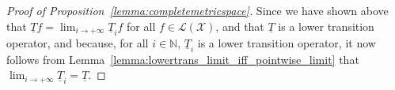 \documentclass[10pt,a4paper]{paper}
\theoremstyle{definition}
\newcommand{\nats}{\mathbb{N}}
\newcommand{\reals}{\mathbb{R}}
\newcommand{\realspos}{\reals_{>0}}
\newcommand{\states}{\mathcal{X}}
\newcommand{\lt}{\underline{T}}
\newcommand{\gambles}{\mathcal{L}}
\newcommand{\gamblesX}{\gambles(\states)}
\newcommand{\norm}[1]{\left\lVert #1 \right\rVert}
\newcommand{\coloneqq}{:\!=}
\begin{document}
\begin{proof}[Proof of Proposition~\ref{lemma:completemetricspace}]
Since we have shown above that $\lt f=\lim_{i\to+\infty}\lt_i f$ for all $f\in\gamblesX$, and that $\lt$ is a lower transition operator, and because, for all $i\in\nats$, $\lt_i$ is a lower transition operator, it now follows from Lemma~\ref{lemma:lowertrans_limit_iff_pointwise_limit} that $\lim_{i\to+\infty}\lt_i=\lt$.
\end{proof}


\end{document}
